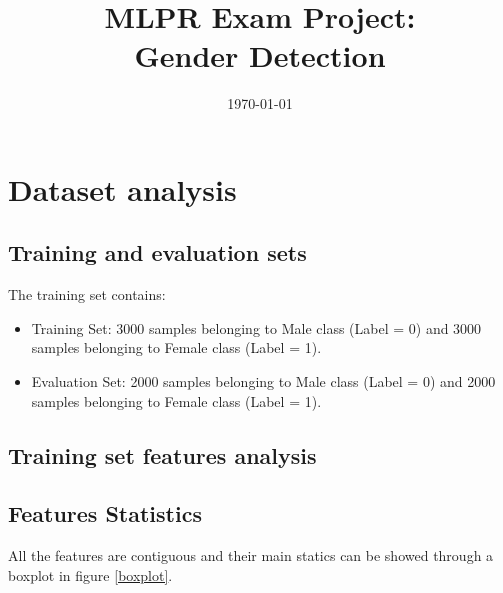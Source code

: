 \documentclass[10pt, a4paper, twocolumn]{article} %
\title{MLPR Exam Project: \\Gender Detection} %
\author{
	\authorstyle{Mattia Rosso [s294711]} %
}
\date{\today} %
\begin{document}
\maketitle %
\thispagestyle{firstpage} %




\section{Dataset analysis}
\subsection{Training and evaluation sets}
The training set contains:
\begin{itemize}
	\item Training Set: 3000 samples belonging to Male class (Label = 0) and
						3000 samples belonging to Female class (Label = 1).
	\item Evaluation Set: 2000 samples belonging to Male class (Label = 0) and
						  2000 samples belonging to Female class (Label = 1).
\end{itemize}

\subsection{Training set features analysis}
\subsection{Features Statistics}
All the features are contiguous and their main statics can be
showed through a boxplot in figure \ref{boxplot}. 
\end{document}
